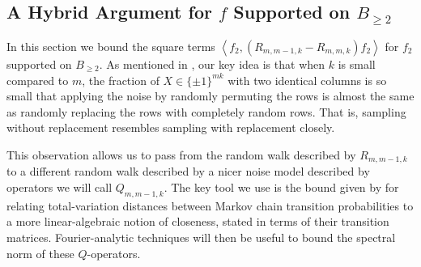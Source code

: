 \subsection{A Hybrid Argument for $f$ Supported on $B_{\geq 2}$}\label{sec:B>=2}


In this section we bound the square terms $\left\langle f_2,(R_{m,m-1,k}-R_{m,m,k})f_2\right\rangle$ for $f_2$ supported on $B_{\geq 2}$. As mentioned in , our key idea is that when $k$ is small compared to $m$, the fraction of $X\in\{\pm1\}^{mk}$ with two identical columns is so small that applying the noise by randomly permuting the rows is almost the same as randomly replacing the rows with completely random rows. That is, sampling without replacement resembles sampling with replacement closely.

This observation allows us to pass from the random walk described by $R_{m,m-1,k}$ to a different random walk described by a nicer noise model described by operators we will call $Q_{m,m-1,k}$. The key tool we use is the bound given by  for relating total-variation distances between Markov chain transition probabilities to a more linear-algebraic notion of closeness, stated in terms of their transition matrices. Fourier-analytic techniques will then be useful to bound the spectral norm of these $Q$-operators.



